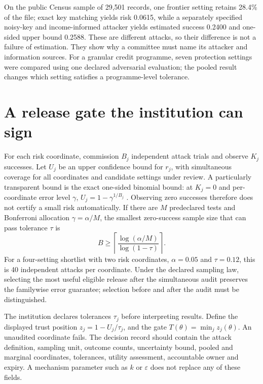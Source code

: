 \documentclass[10pt,a4paper]{article}
\begin{document}
On the public Census sample of 29,501 records, one frontier setting retains 28.4\% of the file; exact key matching yields risk 0.0615, while a separately specified noisy-key and income-informed attacker yields estimated success 0.2400 and one-sided upper bound 0.2588. These are different attacks, so their difference is not a failure of estimation. They show why a committee must name its attacker and information sources. For a granular credit programme, seven protection settings were compared using one declared adversarial evaluation; the pooled result changes which setting satisfies a programme-level tolerance.

\section{A release gate the institution can sign}
For each risk coordinate, commission $B_j$ independent attack trials and observe $K_j$ successes. Let $U_j$ be an upper confidence bound for $r_j$, with simultaneous coverage for all coordinates and candidate settings under review. A particularly transparent bound is the exact one-sided binomial bound: at $K_j=0$ and per-coordinate error level $\gamma$, $U_j=1-\gamma^{1/B_j}$ \citep{clopper1934}. Observing zero successes therefore does not certify a small risk automatically. If there are $M$ predeclared tests and Bonferroni allocation $\gamma=\alpha/M$, the smallest zero-success sample size that can pass tolerance $\tau$ is
\begin{equation}\label{eq:budget}
B\geq\left\lceil\frac{\log(\alpha/M)}{\log(1-\tau)}\right\rceil.
\end{equation}
For a four-setting shortlist with two risk coordinates, $\alpha=0.05$ and $\tau=0.12$, this is 40 independent attacks per coordinate. Under the declared sampling law, selecting the most useful eligible release after the simultaneous audit preserves the familywise error guarantee; selection before and after the audit must be distinguished.

The institution declares tolerances $\tau_j$ before interpreting results. Define the displayed trust position $z_j=1-U_j/\tau_j$, and the gate $T(\theta)=\min_jz_j(\theta)$. An unaudited coordinate fails. The decision record should contain the attack definition, sampling unit, outcome counts, uncertainty bound, pooled and marginal coordinates, tolerances, utility assessment, accountable owner and expiry. A mechanism parameter such as $k$ or $\varepsilon$ does not replace any of these fields.
\end{document}
